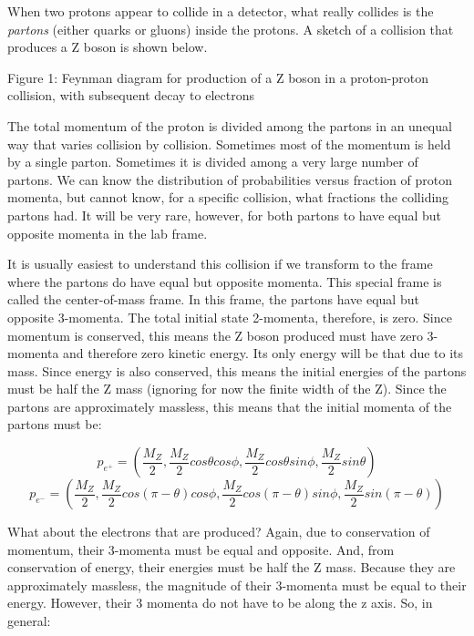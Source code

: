 When two protons appear to collide in a detector, what really collides is the {\it partons} (either quarks or gluons) inside the protons.  A sketch of a collision that produces a Z boson is shown below.
 


Figure 1: Feynman diagram for production of a Z boson in a proton-proton collision, with subsequent decay to electrons


The total momentum of the proton is divided among the partons in an unequal way that varies collision by collision.  Sometimes most of the momentum is held by a single parton.  Sometimes it is divided among a very large number of partons.  We can know the distribution of probabilities versus fraction of proton momenta, but cannot know, for a specific collision, what fractions the colliding partons had.  It will be very rare, however, for both partons to have equal but opposite momenta in the lab frame.

It is usually easiest to understand this collision if we transform to the frame where the partons do have equal but opposite momenta.  This special frame is called the center-of-mass frame.  In this frame, the partons have equal but opposite 3-momenta.  The total initial state 2-momenta, therefore, is zero.  Since momentum is conserved, this means the Z boson produced must have zero 3-momenta and therefore zero kinetic energy.  Its only energy will be that due to its mass.  Since energy is also conserved, this means the initial energies of the partons must be half the Z mass (ignoring for now the finite width of the Z).  Since the partons are approximately massless, this means that the initial momenta of the partons must be:

\begin{equation}
 p_{e^+} = (\frac{M_Z}{2}, \frac{M_Z}{2} cos \theta cos \phi ,  \frac{M_Z}{2} cos \theta sin \phi , \frac{M_Z}{2} sin \theta) 
\end{equation}
\begin{equation}
 p_{e^-} = (\frac{M_Z}{2}, \frac{M_Z}{2} cos (\pi - \theta) cos \phi ,  \frac{M_Z}{2} cos  (\pi - \theta) sin \phi , \frac{M_Z}{2} sin  (\pi - \theta)) 
\end{equation}

\noindent What about the electrons that are produced?  Again, due to conservation of momentum, their 3-momenta must be equal and opposite.  And, from conservation of energy, their energies must be half the Z mass.  Because they are approximately massless, the magnitude of their 3-momenta must be equal to their energy.  However, their 3 momenta do not have to be along the z axis.  So, in general:
	  

